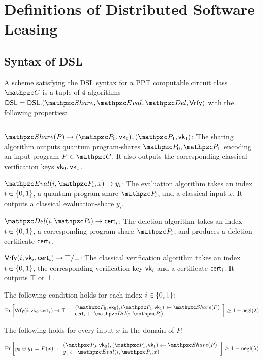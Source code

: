 \section{Definitions of Distributed Software Leasing}\label{sec:dsl}

\subsection{Syntax of DSL}

A scheme satisfying the DSL syntax for a PPT computable circuit
class $\qC$ is a tuple of 4 algorithms $\DSL = \DSL.(\Sh, \Ev, \Del,
\Vrfy)$ with the following properties:

\begin{description}

\item [Syntax:] $ $
\item $\Sh(P) \rightarrow (\qP_0, \vk_0), (\qP_1,
\vk_1)$: The sharing algorithm outputs quantum
program-shares $\qP_0, \qP_1$ encoding an input program $P \in \qC$.
It also outputs the corresponding classical verification keys
$\mathsf{vk}_0, \mathsf{vk}_1$.

\item $\Ev(i, \qP_i, x) \rightarrow y_i$:
The evaluation algorithm takes an index $i \in \{0,1\}$, a quantum
program-share $\qP_i$, and a classical input $x$. It
outputs a classical evaluation-share $y_i$.

\item $\Del(i, \qP_i) \rightarrow \cert_i$: The deletion
algorithm takes an index $i \in \{0,1\}$, a corresponding program-share
$\qP_i$, and produces a deletion certificate $\mathsf{cert}_i$.

\item $\mathsf{Vrfy}(i, \mathsf{vk}_i, \mathsf{cert}_i) \rightarrow \top/\bot$: The 
classical verification algorithm takes an index $i \in \{0,1\}$, the
corresponding verification key $\mathsf{vk}_i$ and a certificate $\mathsf{cert}_i$.
It outputs $\top$ or $\bot$.

\item [Deletion Correctness:] The following condition holds for each
index $i \in \{0,1\}$:
\begin{align}
\Pr\left[
\Vrfy(i, \vk_i, \cert_i) \rightarrow \top
\ :
\begin{array}{ll}
(\qP_0, \vk_0), (\qP_1, \vk_1) \gets \Sh(P)\\
\cert_i \leftarrow \Del(i, \qP_i)
\end{array}
\right] \geq 1 - \negl(\secp)
\end{align}

\item [Evaluation Correctness:] The following holds for every input
$x$ in the domain of $P$:

\begin{align}
\Pr\left[
y_0 \xor y_1 = P(x)
\ :
\begin{array}{ll}
(\qP_0, \vk_0), (\qP_1, \vk_1) \gets \Sh(P)\\
y_i \leftarrow \Ev(i, \qP_i, x)
\end{array}
\right] \geq 1 - \negl(\secp)
\end{align}
\end{description}

